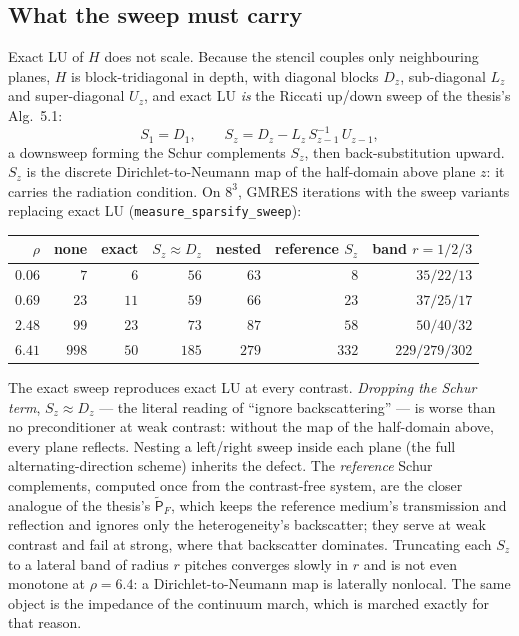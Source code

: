 \documentclass[11pt,a4paper]{article}
\begin{document}
\subsection{What the sweep must carry}

Exact LU of $H$ does not scale. Because the stencil couples only neighbouring planes, $H$ is
block-tridiagonal in depth, with diagonal blocks $D_z$, sub-diagonal $L_z$ and super-diagonal
$U_z$, and exact LU \emph{is} the Riccati up/down sweep of the thesis's Alg.~5.1:
\begin{equation}
S_1 = D_1, \qquad S_z = D_z - L_z\, S_{z-1}^{-1}\, U_{z-1},
\label{eq:schur}
\end{equation}
a downsweep forming the Schur complements $S_z$, then back-substitution upward. $S_z$ is the
discrete Dirichlet-to-Neumann map of the half-domain above plane $z$: it carries the radiation
condition. On $8^3$, GMRES iterations with the sweep variants replacing exact LU
(\texttt{measure\_sparsify\_sweep}):
\begin{center}
\begin{tabular}{@{}rrrrrrr@{}}
\toprule
$\rho$ & none & exact & $S_z \approx D_z$ & nested & reference $S_z$ & band $r = 1/2/3$ \\
\midrule
$0.06$ & $7$ & $6$ & $56$ & $63$ & $8$ & $35/22/13$\\
$0.69$ & $23$ & $11$ & $59$ & $66$ & $23$ & $37/25/17$\\
$2.48$ & $99$ & $23$ & $73$ & $87$ & $58$ & $50/40/32$\\
$6.41$ & $998$ & $50$ & $185$ & $279$ & $332$ & $229/279/302$\\
\bottomrule
\end{tabular}
\end{center}
The exact sweep reproduces exact LU at every contrast. \emph{Dropping the Schur term},
$S_z \approx D_z$ --- the literal reading of ``ignore backscattering'' --- is worse than no
preconditioner at weak contrast: without the map of the half-domain above, every plane reflects.
Nesting a left/right sweep inside each plane (the full alternating-direction scheme) inherits the
defect. The \emph{reference} Schur complements, computed once from the contrast-free system,
are the closer analogue of the thesis's $\tilde{\mathsf{P}}_F$, which keeps the reference
medium's transmission and reflection and ignores only the heterogeneity's backscatter; they
serve at weak contrast and fail at strong, where that backscatter dominates. Truncating each
$S_z$ to a lateral band of radius $r$ pitches converges slowly in $r$ and is not even monotone at
$\rho = 6.4$: a Dirichlet-to-Neumann map is laterally nonlocal. The same object is the
impedance of the continuum march, which is marched exactly for that reason.
\end{document}
